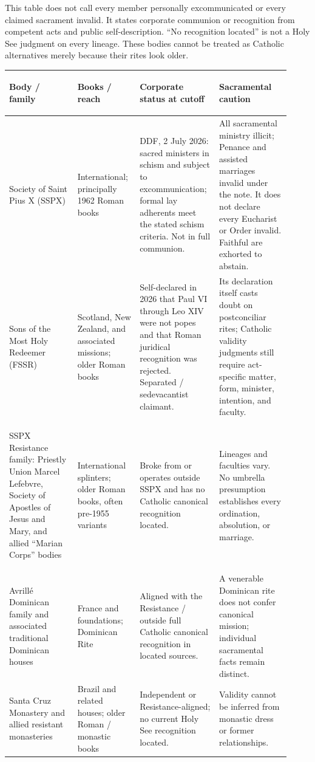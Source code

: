 This table does not call every member personally excommunicated or every claimed sacrament invalid. It states corporate communion or recognition from competent acts and public self-description. “No recognition located” is not a Holy See judgment on every lineage. These bodies cannot be treated as Catholic alternatives merely because their rites look older.

\begin{longtable}{>{\bfseries\raggedright\arraybackslash}p{0.23\linewidth}>{\raggedright\arraybackslash}p{0.20\linewidth}>{\raggedright\arraybackslash}p{0.25\linewidth}>{\raggedright\arraybackslash}p{0.24\linewidth}}
\toprule
\textbf{Body / family} & \textbf{Books / reach} & \textbf{Corporate status at cutoff} & \textbf{Sacramental caution}\\
\midrule
\endhead
Society of Saint Pius X (SSPX) & International; principally 1962 Roman books & DDF, 2 July 2026: sacred ministers in schism and subject to excommunication; formal lay adherents meet the stated schism criteria. Not in full communion. & All sacramental ministry illicit; Penance and assisted marriages invalid under the note. It does not declare every Eucharist or Order invalid. Faithful are exhorted to abstain.\\
Sons of the Most Holy Redeemer (FSSR) & Scotland, New Zealand, and associated missions; older Roman books & Self-declared in 2026 that Paul VI through Leo XIV were not popes and that Roman juridical recognition was rejected. Separated / sedevacantist claimant. & Its declaration itself casts doubt on postconciliar rites; Catholic validity judgments still require act-specific matter, form, minister, intention, and faculty.\\
SSPX Resistance family: Priestly Union Marcel Lefebvre, Society of Apostles of Jesus and Mary, and allied “Marian Corps” bodies & International splinters; older Roman books, often pre-1955 variants & Broke from or operates outside SSPX and has no Catholic canonical recognition located. & Lineages and faculties vary. No umbrella presumption establishes every ordination, absolution, or marriage.\\
Avrillé Dominican family and associated traditional Dominican houses & France and foundations; Dominican Rite & Aligned with the Resistance / outside full Catholic canonical recognition in located sources. & A venerable Dominican rite does not confer canonical mission; individual sacramental facts remain distinct.\\
Santa Cruz Monastery and allied resistant monasteries & Brazil and related houses; older Roman / monastic books & Independent or Resistance-aligned; no current Holy See recognition located. & Validity cannot be inferred from monastic dress or former relationships.\\

\end{longtable}
